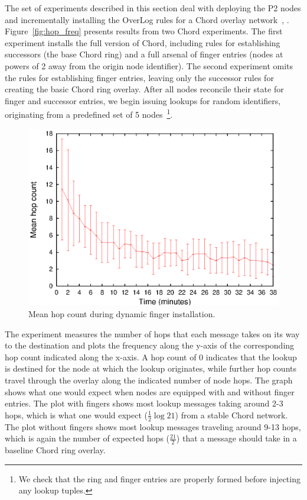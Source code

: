 \documentclass[12pt]{article}
\begin{document}
{The set of experiments described in this section deal with deploying the P2 nodes and
incrementally installing the OverLog rules for a Chord overlay network~\cite{p2:sosp},
\cite{chord}. Figure~\ref{fig:hop_freq} presents results from two Chord experiments. 
The first experiment installs the full version of Chord, including rules for establishing
successors (the base Chord ring) and a full arsenal of finger entries (nodes at powers
of 2 away from the origin node identifier). The second experiment omits the rules for
establishing finger entries, leaving only the successor rules for creating the basic Chord 
ring overlay. After all nodes reconcile their state for finger and successor entries, we begin
issuing lookups for random identifiers, originating from a predefined set of 5 nodes~\footnote{We
check that the ring and finger entries are properly formed before injecting any lookup tuples.}. 

\begin{figure}[htbp] %
   \centering
   \includegraphics{./data/hop_lookup_dynamic.eps} 
   \caption{Mean hop count during dynamic finger installation.}
   \label{fig:hop_dynamic}
\end{figure}

The experiment measures the number of hops that each message takes on its way to 
the destination and plots the frequency along the y-axis of the corresponding hop count 
indicated along the x-axis. A hop count of $0$ indicates that the lookup is destined for the
node at which the lookup originates, while further hop counts travel through the overlay along
the indicated number of node hops. The graph shows what one would expect when nodes
are equipped with and without finger entries. The plot with fingers shows most lookup messages
taking around 2-3 hops, which is what one would expect ($\frac{1}{2}\log{21}$) from a stable 
Chord network. The plot without fingers shows most lookup messages traveling around 9-13 
hops, which is again the number of expected hops ($\frac{21}{2}$) that a message should take
in a baseline Chord ring overlay.

}
\end{document}
